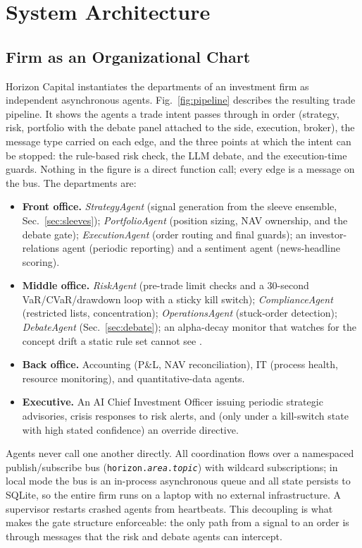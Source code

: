 \documentclass[10pt,twocolumn]{IEEEtran}
\begin{document}
\section{System Architecture}

\subsection{Firm as an Organizational Chart}

Horizon Capital instantiates the departments of an investment firm as
independent asynchronous agents. Fig.~\ref{fig:pipeline} describes the
resulting trade pipeline. It shows the agents a trade intent passes through in
order (strategy, risk, portfolio with the debate panel attached to the
side, execution, broker), the message type carried on each edge, and the
three points at which the intent can be stopped: the rule-based risk check,
the LLM debate, and the execution-time guards. Nothing in the figure is a
direct function call; every edge is a message on the bus. The departments are:

\begin{itemize}
\item \textbf{Front office.} \emph{StrategyAgent} (signal generation from
the sleeve ensemble, Sec.~\ref{sec:sleeves}); \emph{PortfolioAgent}
(position sizing, NAV ownership, and the debate gate);
\emph{ExecutionAgent} (order routing and final guards); an investor-relations
agent (periodic reporting) and a sentiment agent (news-headline scoring).
\item \textbf{Middle office.} \emph{RiskAgent} (pre-trade limit checks and a
30-second VaR/CVaR/drawdown loop with a sticky kill switch);
\emph{ComplianceAgent} (restricted lists, concentration);
\emph{OperationsAgent} (stuck-order detection); \emph{DebateAgent}
(Sec.~\ref{sec:debate}); an alpha-decay monitor that watches for the concept
drift a static rule set cannot see \cite{wang2015concept}.
\item \textbf{Back office.} Accounting (P\&L, NAV reconciliation), IT
(process health, resource monitoring), and quantitative-data agents.
\item \textbf{Executive.} An AI Chief Investment Officer issuing periodic
strategic advisories, crisis responses to risk alerts, and (only under a
kill-switch state with high stated confidence) an override directive.
\end{itemize}

Agents never call one another directly. All coordination flows over a
namespaced publish/subscribe bus \cite{eugster2003faces}
(\texttt{horizon.\textit{area}.\textit{topic}})
with wildcard subscriptions; in local mode the bus is an in-process
asynchronous queue and all state persists to SQLite, so the entire firm runs
on a laptop with no external infrastructure. A supervisor restarts crashed
agents from heartbeats. This decoupling is what makes the gate structure
enforceable: the only path from a signal to an order is through messages
that the risk and debate agents can intercept.
\end{document}
